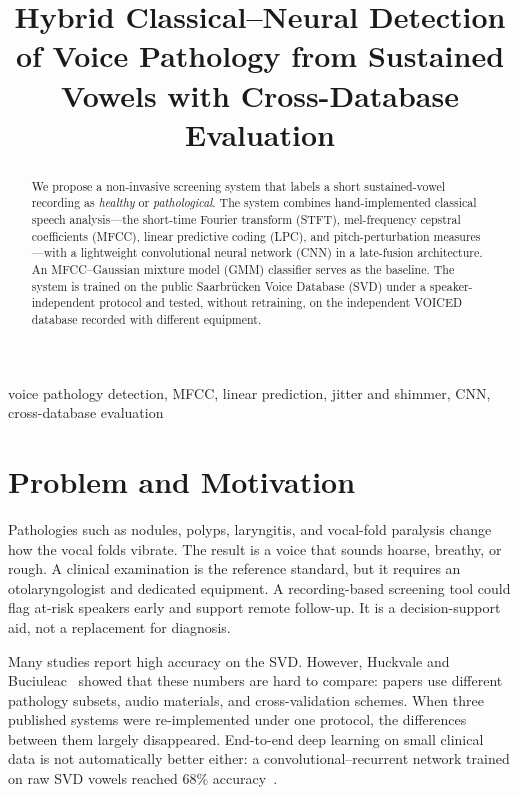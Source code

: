 \documentclass[conference]{IEEEtran}
\begin{document}
\title{Hybrid Classical--Neural Detection of Voice Pathology from Sustained Vowels with Cross-Database Evaluation}

\author{
}

\maketitle

\begin{abstract}
We propose a non-invasive screening system that labels a short sustained-vowel recording as \emph{healthy} or \emph{pathological}. The system combines hand-implemented classical speech analysis---the short-time Fourier transform (STFT), mel-frequency cepstral coefficients (MFCC), linear predictive coding (LPC), and pitch-perturbation measures---with a lightweight convolutional neural network (CNN) in a late-fusion architecture. An MFCC--Gaussian mixture model (GMM) classifier serves as the baseline. The system is trained on the public Saarbr\"ucken Voice Database (SVD) under a speaker-independent protocol and tested, without retraining, on the independent VOICED database recorded with different equipment.
\end{abstract}

\begin{IEEEkeywords}
voice pathology detection, MFCC, linear prediction, jitter and shimmer, CNN, cross-database evaluation
\end{IEEEkeywords}

\section{Problem and Motivation}
Pathologies such as nodules, polyps, laryngitis, and vocal-fold paralysis change how the vocal folds vibrate. The result is a voice that sounds hoarse, breathy, or rough. A clinical examination is the reference standard, but it requires an otolaryngologist and dedicated equipment. A recording-based screening tool could flag at-risk speakers early and support remote follow-up. It is a decision-support aid, not a replacement for diagnosis.

Many studies report high accuracy on the SVD. However, Huckvale and Buciuleac~\cite{huckvale2021} showed that these numbers are hard to compare: papers use different pathology subsets, audio materials, and cross-validation schemes. When three published systems were re-implemented under one protocol, the differences between them largely disappeared. End-to-end deep learning on small clinical data is not automatically better either: a convolutional--recurrent network trained on raw SVD vowels reached 68\% accuracy~\cite{harar2017}.
\end{document}
